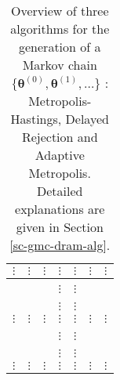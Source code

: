 \begin{sidewaystable}[h]
\begin{tabular}{|c||c|c||c|c||c|c|}
\hline
\hline
$\vdots$    & $\vdots$      & $\vdots$                  & $\vdots$      & $\vdots$                & $\vdots$      & $\vdots$                 \\
\hline
\hline
            &               &                           &               &                         &               &                          \\
\cline{4-5}
            &               &                           & $\vdots$      & $\vdots$                &               &                          \\
\hline
\hline
            &               &                           &               &                         &               &                          \\
\cline{4-5}
            &               &                           & $\vdots$      & $\vdots$                &               &                          \\
\hline
\hline
$\vdots$    & $\vdots$      & $\vdots$                  & $\vdots$      & $\vdots$                & $\vdots$      & $\vdots$                 \\
\hline
\hline
            &               &                           &               &                         &               &                          \\
\cline{4-5}
            &               &                           & $\vdots$      & $\vdots$                &               &                          \\
\hline
\hline
            &               &                           &               &                         &               &                          \\
\cline{4-5}
            &               &                           & $\vdots$      & $\vdots$                &               &                          \\
\hline
\hline
$\vdots$    & $\vdots$      & $\vdots$                  & $\vdots$      & $\vdots$                & $\vdots$      & $\vdots$                 \\
\hline
\end{tabular}
\caption{Overview of three algorithms for the generation of a Markov chain 
$\{\boldsymbol{\theta}^{(0)},\boldsymbol{\theta}^{(1)},\ldots\}$
: Metropolis-Hastings, Delayed Rejection and Adaptive Metropolis.
Detailed explanations are given in Section \ref{sc-gmc-dram-alg}.}
\label{tab-dram}
\end{sidewaystable}

